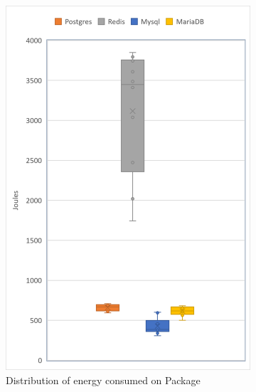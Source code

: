    \begin{figure}[h]
        \centering
        \begin{subfigure}[b]{0.325\textwidth}
            \centering
			\includegraphics[width=1\columnwidth]{results/boxplot/Packgage.png}
			\caption[Distribution of energy consumed on Package]%
            {{\small Distribution of energy consumed on Package}}    
			\label{fig:bocplotyenergyPackage}
        \end{subfigure}
        \begin{subfigure}[b]{0.325\textwidth}   
            \centering 

\end{subfigure}
\end{figure}
